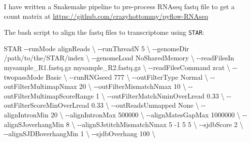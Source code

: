 \documentclass[
]{book}
\newenvironment{Shaded}{\begin{snugshade}}{\end{snugshade}}
\newcommand{\AttributeTok}[1]{\textcolor[rgb]{0.13,0.29,0.53}{#1}}
\newcommand{\DataTypeTok}[1]{\textcolor[rgb]{0.13,0.29,0.53}{#1}}
\newcommand{\ExtensionTok}[1]{#1}
\newcommand{\NormalTok}[1]{#1}
\begin{document}
I have written a Snakemake pipeline to pre-process RNAseq fastq file to get a count matrix at \url{https://github.com/crazyhottommy/pyflow-RNAseq}

The bash script to align the fastq files to transcriptome using \texttt{STAR}:

\begin{Shaded}
\begin{Highlighting}[]
\ExtensionTok{STAR} \AttributeTok{{-}{-}runMode}\NormalTok{ alignReads }\DataTypeTok{\textbackslash{}}
        \AttributeTok{{-}{-}runThreadN}\NormalTok{ 5 }\DataTypeTok{\textbackslash{}}
        \AttributeTok{{-}{-}genomeDir}\NormalTok{ /path/to/the/STAR/index }\DataTypeTok{\textbackslash{}}
        \AttributeTok{{-}{-}genomeLoad}\NormalTok{ NoSharedMemory }\DataTypeTok{\textbackslash{}}
        \AttributeTok{{-}{-}readFilesIn}\NormalTok{ mysample\_R1.fastq.gz mysample\_R2.fastq.gz }\DataTypeTok{\textbackslash{}}
        \AttributeTok{{-}{-}readFilesCommand}\NormalTok{ zcat }\DataTypeTok{\textbackslash{}}
        \AttributeTok{{-}{-}twopassMode}\NormalTok{ Basic }\DataTypeTok{\textbackslash{}}
        \AttributeTok{{-}{-}runRNGseed}\NormalTok{ 777 }\DataTypeTok{\textbackslash{}}
        \AttributeTok{{-}{-}outFilterType}\NormalTok{ Normal }\DataTypeTok{\textbackslash{}}
        \AttributeTok{{-}{-}outFilterMultimapNmax}\NormalTok{ 20 }\DataTypeTok{\textbackslash{}}
        \AttributeTok{{-}{-}outFilterMismatchNmax}\NormalTok{ 10 }\DataTypeTok{\textbackslash{}}
        \AttributeTok{{-}{-}outFilterMultimapScoreRange}\NormalTok{ 1 }\DataTypeTok{\textbackslash{}}
        \AttributeTok{{-}{-}outFilterMatchNminOverLread}\NormalTok{ 0.33 }\DataTypeTok{\textbackslash{}}
        \AttributeTok{{-}{-}outFilterScoreMinOverLread}\NormalTok{ 0.33 }\DataTypeTok{\textbackslash{}}
        \AttributeTok{{-}{-}outReadsUnmapped}\NormalTok{ None }\DataTypeTok{\textbackslash{}}
        \AttributeTok{{-}{-}alignIntronMin}\NormalTok{ 20 }\DataTypeTok{\textbackslash{}}
        \AttributeTok{{-}{-}alignIntronMax}\NormalTok{ 500000 }\DataTypeTok{\textbackslash{}}
        \AttributeTok{{-}{-}alignMatesGapMax}\NormalTok{ 1000000 }\DataTypeTok{\textbackslash{}}
        \AttributeTok{{-}{-}alignSJoverhangMin}\NormalTok{ 8 }\DataTypeTok{\textbackslash{}}
        \AttributeTok{{-}{-}alignSJstitchMismatchNmax}\NormalTok{ 5 }\AttributeTok{{-}1}\NormalTok{ 5 5 }\DataTypeTok{\textbackslash{}}
        \AttributeTok{{-}{-}sjdbScore}\NormalTok{ 2 }\DataTypeTok{\textbackslash{}}
        \AttributeTok{{-}{-}alignSJDBoverhangMin}\NormalTok{ 1 }\DataTypeTok{\textbackslash{}}
        \AttributeTok{{-}{-}sjdbOverhang}\NormalTok{ 100 }\DataTypeTok{\textbackslash{}}

\end{Highlighting}
\end{Shaded}
\end{document}
